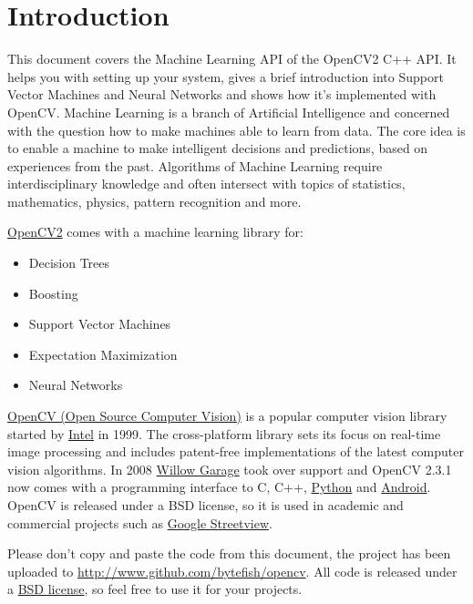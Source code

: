 \section{Introduction}

This document covers the Machine Learning API of the OpenCV2 C++ API. It helps you with setting up your system, gives a brief introduction into Support Vector Machines and Neural Networks and shows how it's implemented with OpenCV. Machine Learning is a branch of Artificial Intelligence and concerned with the question how to make machines able to learn from data. The core idea is to enable a machine to make intelligent decisions and predictions, based on experiences from the past. Algorithms of Machine Learning require interdisciplinary knowledge and often intersect with topics of statistics, mathematics, physics, pattern recognition and more.

\href{http://opencv.willowgarage.com}{OpenCV2} comes with a machine learning library for:
\begin{itemize}
 \item Decision Trees
 \item Boosting
 \item Support Vector Machines
 \item Expectation Maximization
 \item Neural Networks
\end{itemize}

\href{http://opencv.willowgarage.com}{OpenCV (Open Source Computer Vision)} is a popular computer vision library started by \href{http://www.intel.com}{Intel} in 1999. The cross-platform library sets its focus on real-time image processing and includes patent-free implementations of the latest computer vision algorithms. In 2008 \href{http://www.willowgarage.com}{Willow Garage} took over support and OpenCV 2.3.1 now comes with a programming interface to C, C++, \href{http://www.python.org}{Python} and \href{http://www.android.com}{Android}. OpenCV is released under a BSD license, so it is used in academic and commercial projects such as \href{http://www.google.com/streetview}{Google Streetview}.

Please don't copy and paste the code from this document, the project has been uploaded to \url{http://www.github.com/bytefish/opencv}. All code is released under a \href{http://www.opensource.org/licenses/bsd-license}{BSD license}, so feel free to use it for your projects.

